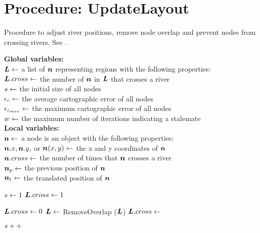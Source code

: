 \section{Procedure: UpdateLayout}

\begin{algorithm}[H]
    \caption{Procedure to adjust river positions, remove node overlap and prevent nodes from crossing rivers. See .}\label{alg:UpdateLayout}
    \textbf{Global variables:} \\
    $ \bm{L} \gets $ a list of $ \bm{n} $ representing regions with the following properties: \\
    \-\hspace{1em}  $\bm{L}.cross \gets $ the number of $ \bm{n} $ in $ \bm{L} $ that crosses a river \\

    $ s \gets $ the initial size of all nodes \\
    $ \epsilon_{c} \gets $ the average cartographic error of all nodes \\
    $ \epsilon_{c_{max}} \gets $ the maximum cartographic error of all nodes \\
    $ w \gets $ the maximum number of iterations indicating a stalemate \\

    \textbf{Local variables:} \\
    $ \bm{n} \gets $ a node is an object with the following properties: \\
    \-\hspace{1em} $ \bm{n}.x, \bm{n}.y, $ or $ \bm{n}(x,y) \gets $ the x and y coordinates of $ \bm{n} $ \\
    \-\hspace{1em} $ \bm{n}.cross \gets $ the number of times that $ \bm{n} $ crosses a river \\
    \-\hspace{1em} $ \bm{n}_{p} \gets $ the previous position of $ \bm{n} $ \\
    \-\hspace{1em} $ \bm{n}_t \gets $ the translated position of $ \bm{n} $ \\

    \begin{algorithmic}[1]

        \State $ s \gets 1 $
        \While{$ \nodeCartographicError < \nodeCartographicErrorMax $}
        \State $ \bm{L}.cross \gets 1 $ 

        \State $ \bm{L}.cross \gets 0 $
        \State $ \bm{L} \gets $ RemoveOverlap ($ \bm{L} $)
        \State {}
        \State $\bm{L}.cross \gets $ 

        \EndWhile

        \State $ s ++ $

        \EndWhile

        \EndProcedure
    \end{algorithmic}
\end{algorithm}

